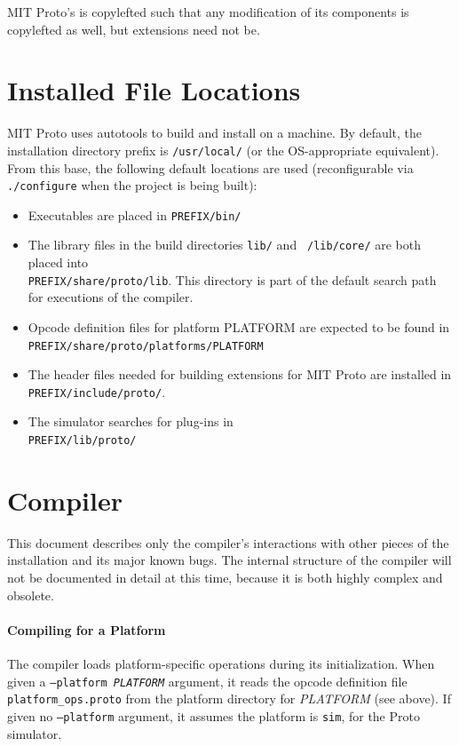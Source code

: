 \documentclass{article}
\newcommand\var[1]{{\tt #1}}
\begin{document}
MIT Proto's is copylefted such that any modification of its components
is copylefted as well, but extensions need not be.

\section{Installed File Locations}

MIT Proto uses autotools to build and install on a machine.  By
default, the installation directory prefix is {\tt /usr/local/} (or
the OS-appropriate equivalent).  From this base, the following default
locations are used (reconfigurable via {\tt ./configure} when the project
is being built):

\begin{itemize}
\item Executables are placed in {\tt PREFIX/bin/}
\item The library files in the build directories {\tt lib/} and {\tt
    /lib/core/} are both placed into \\{\tt PREFIX/share/proto/lib}.
  This directory is part of the default search path for executions of
  the compiler.
\item Opcode definition files for platform PLATFORM are expected 
  to be found in \\{\tt PREFIX/share/proto/platforms/PLATFORM}
\item The header files needed for building extensions for MIT Proto
  are installed in \\{\tt PREFIX/include/proto/}.
\item The simulator searches for plug-ins in \\{\tt PREFIX/lib/proto/}
\end{itemize}

\section{Compiler}

This document describes only the compiler's interactions with other
pieces of the installation and its major known bugs.  The internal
structure of the compiler will not be documented in detail at this
time, because it is both highly complex and obsolete.

\paragraph{Compiling for a Platform}
The compiler loads platform-specific operations during its
initialization.  When given a \var{--platform {\it PLATFORM}}
argument, it reads the opcode definition file {\tt
  platform\_ops.proto} from the platform directory for {\it PLATFORM}
(see above).  If given no \var{--platform} argument, it assumes the
platform is \var{sim}, for the Proto simulator.
\end{document}
